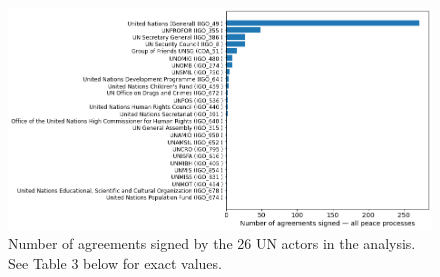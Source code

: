 \documentclass{article}
\begin{document}
\begin{figure}[H]
\begin{center}
\includegraphics[scale=0.36]{./assets/figure_1.png}
\caption{Number of agreements signed by the 26 UN actors in the analysis. See Table 3 below for exact values.}
\end{center}
\end{figure}
\end{document}
